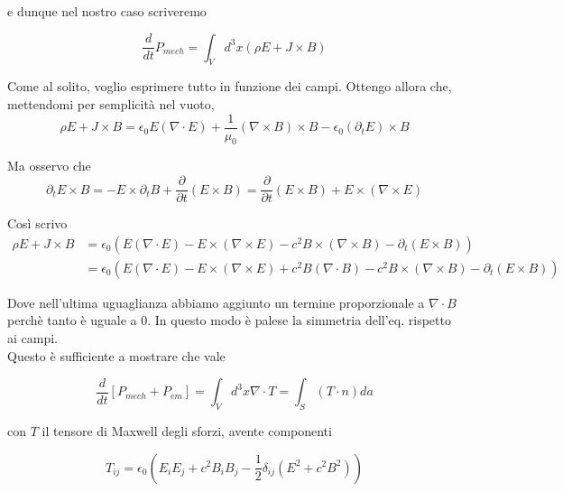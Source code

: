 \documentclass{report}
\begin{document}
e dunque nel nostro caso scriveremo

\begin{equation}
    \frac{d}{dt}P_{mech} = \int_V d^3x (\rho E + J\times B)
\end{equation}

Come al solito, voglio esprimere tutto in funzione dei campi. Ottengo allora che, mettendomi per semplicità nel vuoto,  
\begin{equation}
    \rho E + J \times B = \epsilon_0E(\nabla \cdot E) + \frac{1}{\mu_0}(\nabla \times B) \times B - \epsilon_0 (\partial_tE) \times B
\end{equation}

Ma osservo che 
\begin{equation}
     \partial_t E \times B = - E \times \partial_t B + \frac{\partial}{\partial t}(E\times B) = \frac{\partial}{\partial t}(E\times B) + E \times (\nabla \times E)
\end{equation}

Così scrivo 
\begin{align}
    \rho E + J \times B &= \epsilon_0(E(\nabla\cdot E) - E\times (\nabla \times E) - c^2 B \times (\nabla \times B) -\partial_t(E \times B)) \\
    &= \epsilon_0(E(\nabla\cdot E) - E\times (\nabla \times E) +c^2 B(\nabla \cdot B)- c^2 B \times (\nabla \times B) -\partial_t(E \times B))
\end{align}

Dove nell'ultima uguaglianza abbiamo aggiunto un termine proporzionale a $\nabla \cdot B$ perchè tanto è uguale a 0. In questo modo è palese la simmetria dell'eq. rispetto ai campi. \\

Questo è sufficiente a mostrare che vale 

\begin{tcolorbox}[colback=doc!15, colframe=black, boxrule=1pt]
\begin{equation}
    \label{momentum_conservation_integral}
    \frac{d}{dt}\left[P_{mech} + P_{em}\right] = \int_V d^3x \nabla \cdot T = \int_S (T\cdot n)da
\end{equation}
\end{tcolorbox}

con $T$ il tensore di Maxwell degli sforzi, avente componenti 

\begin{equation}
    \label{Maxwell_stress_tensor}
    T_{ij} = \epsilon_0 (E_iE_j + c^2B_iB_j -\frac{1}{2}\delta_{ij}(E^2 + c^2B^2))
\end{equation}
\end{document}
